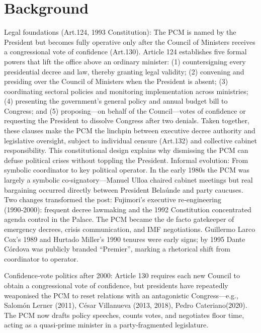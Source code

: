\documentclass[a4paper, 12pt]{article}
\begin{document}
\section{Background}\label{backg-tables} %

Legal foundations (Art.124, 1993 Constitution): The PCM is named by the President but becomes fully operative only after the Council of Ministers receives a congressional vote of confidence (Art.130). Article 124 establishes five formal powers that lift the office above an ordinary minister: (1) countersigning every presidential decree and law, thereby granting legal validity; (2) convening and presiding over the Council of Ministers when the President is absent; (3) coordinating sectoral policies and monitoring implementation across ministries; (4) presenting the government’s general policy and annual budget bill to Congress; and (5) proposing—on behalf of the Council—votes of confidence or requesting the President to dissolve Congress after two denials. Taken together, these clauses make the PCM the linchpin between executive decree authority and legislative oversight, subject to individual censure (Art.132) and collective cabinet responsibility. This constitutional design explains why dismissing the PCM can defuse political crises without toppling the President.
Informal evolution: From symbolic coordinator to key political operator. In the early 1980s the PCM was largely a symbolic co‑signatory—Manuel Ulloa chaired cabinet meetings but real bargaining occurred directly between President Belaúnde and party caucuses. Two changes transformed the post:
Fujimori’s executive re‑engineering (1990‑2000): frequent decree lawmaking and the 1992 Constitution concentrated agenda control in the Palace. The PCM became the de facto gatekeeper of emergency decrees, crisis communication, and IMF negotiations. Guillermo Larco Cox’s 1989 and Hurtado Miller’s 1990 tenures were early signs; by 1995 Dante Córdova was publicly branded “Premier”, marking a rhetorical shift from coordinator to operator.

Confidence‑vote politics after 2000: Article 130 requires each new Council to obtain a congressional vote of confidence, but presidents have repeatedly weaponised the PCM to reset relations with an antagonistic Congress—e.g., Salomón Lerner (2011), César Villanueva (2013, 2018), Pedro Cateriano(2020). The PCM now drafts policy speeches, counts votes, and negotiates floor time, acting as a quasi‑prime minister in a party‑fragmented legislature.
\end{document}
